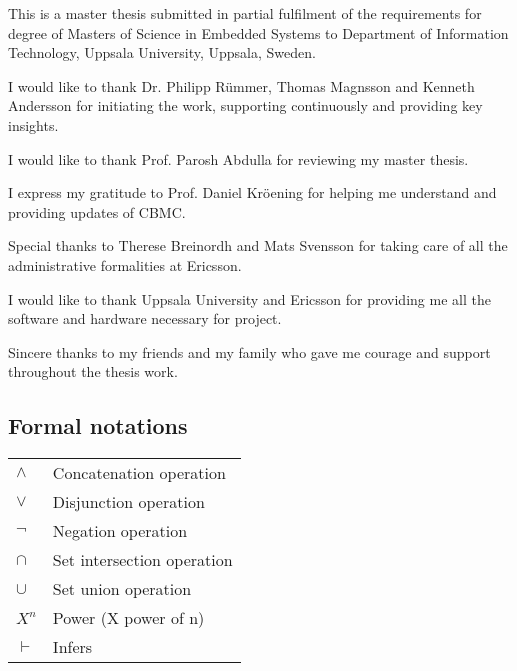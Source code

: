 \documentclass[titlepage]{book}
\begin{document}
This is a master thesis submitted in partial fulfilment of the requirements for degree of Masters of Science in Embedded Systems to Department of Information Technology, Uppsala University, Uppsala, Sweden.

I would like to thank Dr. Philipp R\"ummer, Thomas Magnsson and Kenneth Andersson for initiating the work, supporting continuously and providing key insights.

I would like to thank Prof. Parosh Abdulla for reviewing my master thesis.

I express my gratitude to Prof. Daniel Kr\"oening for helping me understand and providing updates of CBMC. 

Special thanks to Therese Breinordh and Mats Svensson for taking care of all the administrative formalities at Ericsson.

I would like to thank Uppsala University and Ericsson for providing me all the software and hardware necessary for project.

Sincere thanks to my friends and my family who gave me courage and support throughout the thesis work.





\newpage
\begin{center}
\section{Formal notations}
\begin{table}[h]
\centering
    \begin{tabular}{l  l}
        $\wedge$ & Concatenation operation \\
        $\vee$ & Disjunction operation \\
        $\neg$ & Negation operation \\
        $\cap$ & Set intersection operation \\
        $\cup$ & Set union operation \\
        $X^n$ & Power (X power of n) \\
        $\vdash$ & Infers

    \end{tabular}
\end{table}
\end{center}


\mainmatter

\setcounter{secnumdepth}{1}







\printindex

{}




\end{document}
